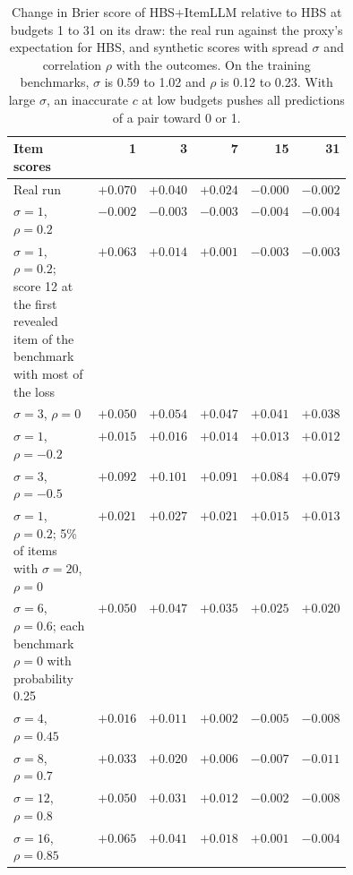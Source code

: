 \documentclass{article}
\begin{document}
\begin{table}[ht]
  \caption{Change in Brier score of HBS+ItemLLM relative to HBS at budgets 1 to 31 on its draw: the real run against the proxy's expectation for HBS, and synthetic scores with spread $\sigma$ and correlation $\rho$ with the outcomes. On the training benchmarks, $\sigma$ is 0.59 to 1.02 and $\rho$ is 0.12 to 0.23. With large $\sigma$, an inaccurate $c$ at low budgets pushes all predictions of a pair toward 0 or 1.}
  \label{tab:itemllm}
  \centering
  \small
  \begin{tabular}{>{\raggedright\arraybackslash}p{0.44\linewidth}rrrrr}
    \toprule
    Item scores & 1 & 3 & 7 & 15 & 31 \\
    \midrule
    Real run & $+0.070$ & $+0.040$ & $+0.024$ & $-0.000$ & $-0.002$ \\
    $\sigma = 1$, $\rho = 0.2$ & $-0.002$ & $-0.003$ & $-0.003$ & $-0.004$ & $-0.004$ \\
    $\sigma = 1$, $\rho = 0.2$; score 12 at the first revealed item of the benchmark with most of the loss & $+0.063$ & $+0.014$ & $+0.001$ & $-0.003$ & $-0.003$ \\
    $\sigma = 3$, $\rho = 0$ & $+0.050$ & $+0.054$ & $+0.047$ & $+0.041$ & $+0.038$ \\
    $\sigma = 1$, $\rho = -0.2$ & $+0.015$ & $+0.016$ & $+0.014$ & $+0.013$ & $+0.012$ \\
    $\sigma = 3$, $\rho = -0.5$ & $+0.092$ & $+0.101$ & $+0.091$ & $+0.084$ & $+0.079$ \\
    $\sigma = 1$, $\rho = 0.2$; 5\% of items with $\sigma = 20$, $\rho = 0$ & $+0.021$ & $+0.027$ & $+0.021$ & $+0.015$ & $+0.013$ \\
    $\sigma = 6$, $\rho = 0.6$; each benchmark $\rho = 0$ with probability 0.25 & $+0.050$ & $+0.047$ & $+0.035$ & $+0.025$ & $+0.020$ \\
    $\sigma = 4$, $\rho = 0.45$ & $+0.016$ & $+0.011$ & $+0.002$ & $-0.005$ & $-0.008$ \\
    $\sigma = 8$, $\rho = 0.7$ & $+0.033$ & $+0.020$ & $+0.006$ & $-0.007$ & $-0.011$ \\
    $\sigma = 12$, $\rho = 0.8$ & $+0.050$ & $+0.031$ & $+0.012$ & $-0.002$ & $-0.008$ \\
    $\sigma = 16$, $\rho = 0.85$ & $+0.065$ & $+0.041$ & $+0.018$ & $+0.001$ & $-0.004$ \\
    \bottomrule
  \end{tabular}
\end{table}
\end{document}
